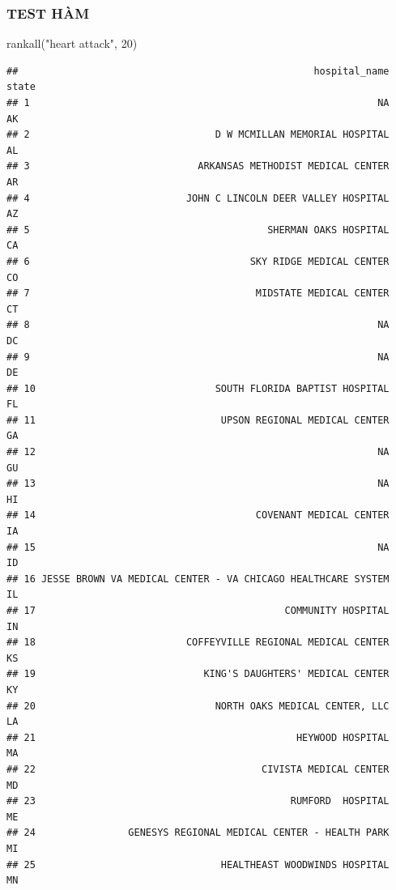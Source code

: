 \documentclass[
]{book}
\newenvironment{Shaded}{\begin{snugshade}}{\end{snugshade}}
\newcommand{\DecValTok}[1]{\textcolor[rgb]{0.00,0.00,0.81}{#1}}
\newcommand{\FunctionTok}[1]{\textcolor[rgb]{0.00,0.00,0.00}{#1}}
\newcommand{\NormalTok}[1]{#1}
\newcommand{\StringTok}[1]{\textcolor[rgb]{0.31,0.60,0.02}{#1}}
\theoremstyle{definition}
\theoremstyle{definition}
\theoremstyle{definition}
\theoremstyle{definition}
\theoremstyle{remark}
\begin{document}
\hypertarget{test-huxe0m-2}{%
\subsubsection{TEST HÀM}\label{test-huxe0m-2}}

\begin{Shaded}
\begin{Highlighting}[]
\FunctionTok{rankall}\NormalTok{(}\StringTok{"heart attack"}\NormalTok{, }\DecValTok{20}\NormalTok{)}
\end{Highlighting}
\end{Shaded}

\begin{verbatim}
##                                                   hospital_name state
## 1                                                            NA    AK
## 2                                D W MCMILLAN MEMORIAL HOSPITAL    AL
## 3                             ARKANSAS METHODIST MEDICAL CENTER    AR
## 4                           JOHN C LINCOLN DEER VALLEY HOSPITAL    AZ
## 5                                         SHERMAN OAKS HOSPITAL    CA
## 6                                      SKY RIDGE MEDICAL CENTER    CO
## 7                                       MIDSTATE MEDICAL CENTER    CT
## 8                                                            NA    DC
## 9                                                            NA    DE
## 10                               SOUTH FLORIDA BAPTIST HOSPITAL    FL
## 11                                UPSON REGIONAL MEDICAL CENTER    GA
## 12                                                           NA    GU
## 13                                                           NA    HI
## 14                                      COVENANT MEDICAL CENTER    IA
## 15                                                           NA    ID
## 16 JESSE BROWN VA MEDICAL CENTER - VA CHICAGO HEALTHCARE SYSTEM    IL
## 17                                           COMMUNITY HOSPITAL    IN
## 18                          COFFEYVILLE REGIONAL MEDICAL CENTER    KS
## 19                             KING'S DAUGHTERS' MEDICAL CENTER    KY
## 20                               NORTH OAKS MEDICAL CENTER, LLC    LA
## 21                                             HEYWOOD HOSPITAL    MA
## 22                                       CIVISTA MEDICAL CENTER    MD
## 23                                            RUMFORD  HOSPITAL    ME
## 24                GENESYS REGIONAL MEDICAL CENTER - HEALTH PARK    MI
## 25                                HEALTHEAST WOODWINDS HOSPITAL    MN

\end{verbatim}
\end{document}
